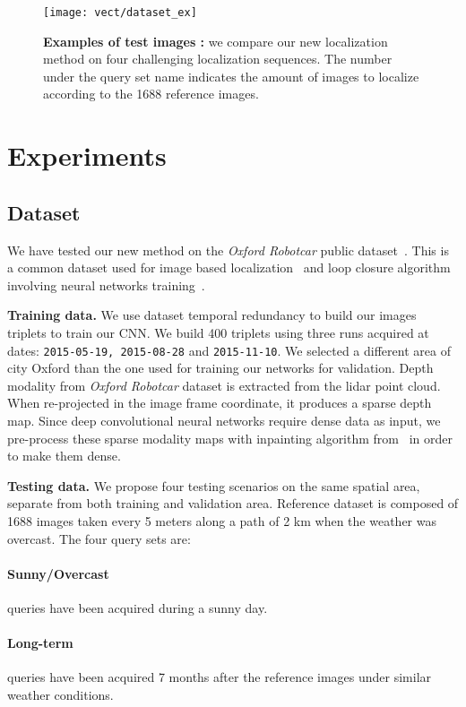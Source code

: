 \begin{figure}
	\center
	\texttt{[image: vect/dataset\_ex]}
	\caption{\label{fig:dataset} \textbf{Examples of test images :} we compare our new localization method on four challenging localization sequences. The number under the query set name indicates the amount of images to localize according to the 1688 reference images.}
\end{figure}

\section{Experiments}
\label{sec:experiments}

\subsection{Dataset}
\label{subsec:dataset}
	We have tested our new method on the \textit{Oxford Robotcar} public dataset~\cite{Maddern2016}. This is a common dataset used for image based localization~\cite{Sattler2018} and loop closure algorithm involving neural networks training~\cite{Porav2018}.
		
\vspace{4pt}\noindent\textbf{Training data.}
	We use dataset temporal redundancy to build our images triplets to train our CNN. We build 400 triplets using three runs acquired at dates: \texttt{2015-05-19, 2015-08-28} and \texttt{2015-11-10}. We selected a different area of city Oxford than the one used for training our networks for validation.
	Depth modality from \textit{Oxford Robotcar} dataset is extracted from the lidar point cloud. When re-projected in the image frame coordinate, it produces a sparse depth map. Since deep convolutional neural networks require dense data as input, we pre-process these sparse modality maps with inpainting algorithm from~\cite{Bevilacqua2017} in order to make them dense.

\vspace{4pt}\noindent\textbf{Testing data.} We propose four testing scenarios on the same spatial area, separate from both training and validation area. Reference dataset is composed of 1688 images taken every 5 meters along a path of 2 km when the weather was overcast. The four query sets are:
	\paragraph{Sunny/Overcast} queries have been acquired during a sunny day.
	\paragraph{Long-term} queries have been acquired 7 months after the reference images under similar weather conditions.
